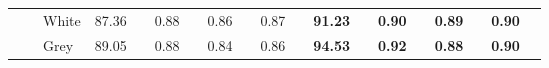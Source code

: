 \begin{table}[!tbh]
{\begin{tabular}{l|l|l|llllllll||llllllll}
                                                                                               &                                  & White                    & \multicolumn{1}{l|}{87.36} & \multicolumn{1}{l|}{}                        & \multicolumn{1}{l|}{0.88} & \multicolumn{1}{l|}{}                       & \multicolumn{1}{l|}{0.86} & \multicolumn{1}{l|}{}                       & \multicolumn{1}{l|}{0.87} &                        & \multicolumn{1}{l|}{\cellcolor[HTML]{FFFE65}\textbf{91.23}} & \multicolumn{1}{l|}{\cellcolor[HTML]{FFFE65}}                                 & \multicolumn{1}{l|}{\cellcolor[HTML]{FFFE65}\textbf{0.90}} & \multicolumn{1}{l|}{\cellcolor[HTML]{FFFE65}}                                & \multicolumn{1}{l|}{\cellcolor[HTML]{FFFE65}\textbf{0.89}} & \multicolumn{1}{l|}{\cellcolor[HTML]{FFFE65}}                                & \multicolumn{1}{l|}{\cellcolor[HTML]{FFFE65}\textbf{0.90}} & \cellcolor[HTML]{FFFE65}                                \\ \cline{3-4} \cline{6-6} \cline{8-8} \cline{10-10} \cline{12-12} \cline{14-14} \cline{16-16} \cline{18-18}
                                                                                               &                                  & Grey                     & \multicolumn{1}{l|}{89.05} & \multicolumn{1}{l|}{}                        & \multicolumn{1}{l|}{0.88} & \multicolumn{1}{l|}{}                       & \multicolumn{1}{l|}{0.84} & \multicolumn{1}{l|}{}                       & \multicolumn{1}{l|}{0.86} &                        & \multicolumn{1}{l|}{\cellcolor[HTML]{FFFE65}\textbf{94.53}} & \multicolumn{1}{l|}{\cellcolor[HTML]{FFFE65}}                                 & \multicolumn{1}{l|}{\cellcolor[HTML]{FFFE65}\textbf{0.92}} & \multicolumn{1}{l|}{\cellcolor[HTML]{FFFE65}}                                & \multicolumn{1}{l|}{\cellcolor[HTML]{FFFE65}\textbf{0.88}} & \multicolumn{1}{l|}{\cellcolor[HTML]{FFFE65}}                                & \multicolumn{1}{l|}{\cellcolor[HTML]{FFFE65}\textbf{0.90}} & \cellcolor[HTML]{FFFE65}                                \\ \cline{3-4} \cline{6-6} \cline{8-8} \cline{10-10} \cline{12-12} \cline{14-14} \cline{16-16} \cline{18-18}

\end{tabular}}
\end{table}
